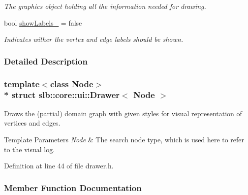 \begin{DoxyCompactItemize}
\begin{DoxyCompactList}\small\item\em The graphics object holding all the information needed for drawing. \end{DoxyCompactList}\item 
bool \hyperlink{structslb_1_1core_1_1ui_1_1Drawer_a580db97e1c2261304eaa4dc63fb22c60}{show\+Labels\+\_\+} = false\hypertarget{structslb_1_1core_1_1ui_1_1Drawer_a580db97e1c2261304eaa4dc63fb22c60}{}\label{structslb_1_1core_1_1ui_1_1Drawer_a580db97e1c2261304eaa4dc63fb22c60}

\begin{DoxyCompactList}\small\item\em Indicates wither the vertex and edge labels should be shown. \end{DoxyCompactList}\end{DoxyCompactItemize}


\subsubsection{Detailed Description}
\subsubsection*{template$<$class Node$>$\\*
struct slb\+::core\+::ui\+::\+Drawer$<$ Node $>$}

Draws the (partial) domain graph with given styles for visual representation of vertices and edges. 


\begin{DoxyTemplParams}{Template Parameters}
{\em Node} & The search node type, which is used here to refer to the visual log. \\
\hline
\end{DoxyTemplParams}


Definition at line 44 of file drawer.\+h.



\subsubsection{Member Function Documentation}
